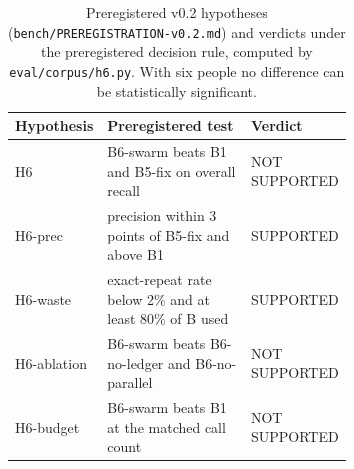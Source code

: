 \begin{table}[t]\centering\small
\begin{tabular}{@{}p{0.17\linewidth}p{0.5\linewidth}l@{}}
\toprule
Hypothesis & Preregistered test & Verdict \\
\midrule
H6 & B6-swarm beats B1 and B5-fix on overall recall & NOT SUPPORTED \\
H6-prec & precision within 3 points of B5-fix and above B1 & SUPPORTED \\
H6-waste & exact-repeat rate below 2\% and at least 80\% of B used & SUPPORTED \\
H6-ablation & B6-swarm beats B6-no-ledger and B6-no-parallel & NOT SUPPORTED \\
H6-budget & B6-swarm beats B1 at the matched call count & NOT SUPPORTED \\
\bottomrule
\end{tabular}
\caption{Preregistered v0.2 hypotheses (\texttt{bench/PREREGISTRATION-v0.2.md}) and verdicts under the preregistered decision rule, computed by \texttt{eval/corpus/h6.py}. With six people no difference can be statistically significant.}
\label{tab:h6}
\end{table}

